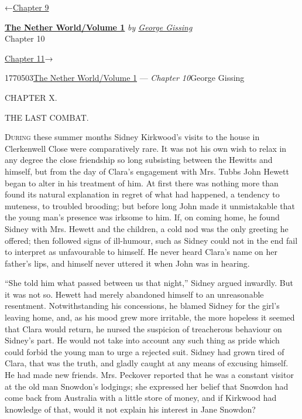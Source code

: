 \hypertarget{headerContainer}{}
\hypertarget{navigationHeader}{}
\protect\hypertarget{headerprevious}{}{←\href{/wiki/The_Nether_World/Volume_1/Chapter_9}{Chapter
9}}

\textbf{\protect\hypertarget{header_title_text}{}{\href{/w/index.php?title=The_Nether_World/Volume_1\&action=edit\&redlink=1}{The
Nether World/Volume 1}}} \emph{by
\href{/wiki/Author:George_Gissing}{\protect\hypertarget{header_author_text}{}{{George
Gissing}}}}\\
\protect\hypertarget{header_section_text}{}{Chapter 10}

\protect\hypertarget{headernext}{}{\href{/wiki/The_Nether_World/Volume_1/Chapter_11}{Chapter
11}→}

\hypertarget{navigationNotes}{}

\hypertarget{ws-data}{}
\protect\hypertarget{ws-article-id}{}{1770503}\protect\hypertarget{ws-title}{}{\href{/w/index.php?title=The_Nether_World/Volume_1\&action=edit\&redlink=1}{The
Nether World/Volume 1} --- \emph{Chapter
10}}\protect\hypertarget{ws-author}{}{George Gissing}

{\protect\hypertarget{215}{}{}}

{CHAPTER X.}

THE LAST COMBAT.

\textsc{During} these summer months Sidney Kirkwood's visits to the
house in Clerkenwell Close were comparatively rare. It was not his own
wish to relax in any degree the close friendship so long subsisting
between the Hewitts and himself, but from the day of Clara's engagement
with Mrs. Tubbs John Hewett began to alter in his treatment of him. At
first there was nothing more than found its natural explanation in
regret of what had happened, a tendency to muteness, to troubled
brooding; but before long John made it unmistakable that the young man's
presence was irksome to him. If, on coming home, he found Sidney with
Mrs. Hewett and the children, a cold nod was the only greeting he
offered; then followed signs of ill-humour,
{\protect\hypertarget{216}{}{}}such as Sidney could not in the end fail
to interpret as unfavourable to himself. He never heard Clara's name on
her father's lips, and himself never uttered it when John was in
hearing.

``She told him what passed between us that night,'' Sidney argued
inwardly. But it was not so. Hewett had merely abandoned himself to an
unreasonable resentment. Notwithstanding his concessions, he blamed
Sidney for the girl's leaving home, and, as his mood grew more
irritable, the more hopeless it seemed that Clara would return, he
nursed the suspicion of treacherous behaviour on Sidney's part. He would
not take into account any such thing as pride which could forbid the
young man to urge a rejected suit. Sidney had grown tired of Clara, that
was the truth, and gladly caught at any means of excusing himself. He
had made new friends. Mrs. Peckover reported that he was a constant
visitor at the old man Snowdon's lodgings; she expressed her belief that
Snowdon had come back from Australia with a little store
{\protect\hypertarget{217}{}{}}of money, and if Kirkwood had knowledge
of that, would it not explain his interest in Jane Snowdon?

